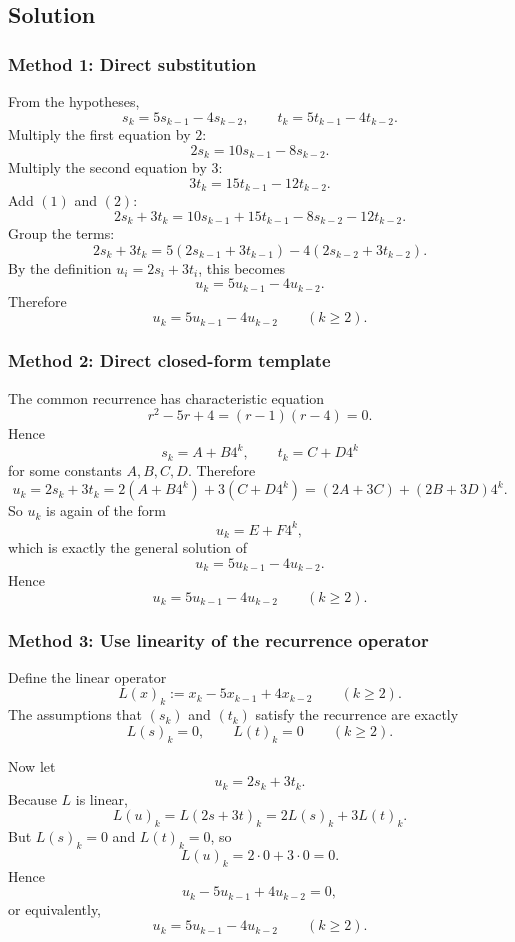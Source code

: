 \documentclass[12pt]{article}
\begin{document}
\subsection{Solution}

\subsubsection{Method 1: Direct substitution}
From the hypotheses,
\[
s_k=5s_{k-1}-4s_{k-2},
\qquad
t_k=5t_{k-1}-4t_{k-2}.
\]
Multiply the first equation by \(2\):
\[
2s_k=10s_{k-1}-8s_{k-2}. \tag{1}
\]
Multiply the second equation by \(3\):
\[
3t_k=15t_{k-1}-12t_{k-2}. \tag{2}
\]
Add \((1)\) and \((2)\):
\[
2s_k+3t_k=10s_{k-1}+15t_{k-1}-8s_{k-2}-12t_{k-2}.
\]
Group the terms:
\[
2s_k+3t_k=5(2s_{k-1}+3t_{k-1})-4(2s_{k-2}+3t_{k-2}).
\]
By the definition \(u_i=2s_i+3t_i\), this becomes
\[
u_k=5u_{k-1}-4u_{k-2}.
\]
Therefore
\[
\boxed{u_k=5u_{k-1}-4u_{k-2}\qquad (k\ge 2).}
\]

\newpage
\subsubsection{Method 2: Direct closed-form template}
The common recurrence has characteristic equation
\[
r^2-5r+4=(r-1)(r-4)=0.
\]
Hence
\[
s_k=A+B4^k,\qquad t_k=C+D4^k
\]
for some constants \(A,B,C,D\).
Therefore
\[
u_k=2s_k+3t_k
=2(A+B4^k)+3(C+D4^k)
=(2A+3C)+(2B+3D)4^k.
\]
So \(u_k\) is again of the form
\[
u_k=E+F4^k,
\]
which is exactly the general solution of
\[
u_k=5u_{k-1}-4u_{k-2}.
\]
Hence
\[
\boxed{u_k=5u_{k-1}-4u_{k-2}\qquad (k\ge 2).}
\]

\newpage
\subsubsection{Method 3: Use linearity of the recurrence operator}
Define the linear operator
\[
L(x)_k:=x_k-5x_{k-1}+4x_{k-2}\qquad (k\ge 2).
\]
The assumptions that \((s_k)\) and \((t_k)\) satisfy the recurrence are exactly
\[
L(s)_k=0,\qquad L(t)_k=0\qquad (k\ge 2).
\]

Now let
\[
u_k=2s_k+3t_k.
\]
Because \(L\) is linear,
\[
L(u)_k=L(2s+3t)_k=2L(s)_k+3L(t)_k.
\]
But \(L(s)_k=0\) and \(L(t)_k=0\), so
\[
L(u)_k=2\cdot 0+3\cdot 0=0.
\]
Hence
\[
u_k-5u_{k-1}+4u_{k-2}=0,
\]
or equivalently,
\[
\boxed{u_k=5u_{k-1}-4u_{k-2}\qquad (k\ge 2).}
\]
\end{document}

